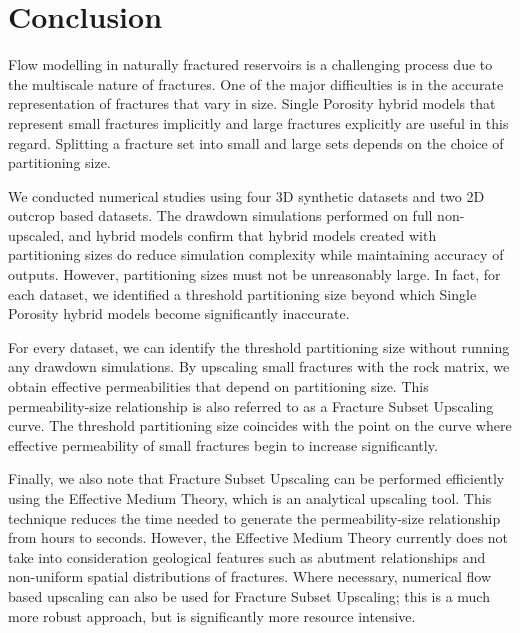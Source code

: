 \documentclass[draft]{agujournal2018}
\begin{document}
\section{Conclusion}
Flow modelling in naturally fractured reservoirs is a challenging process due to the multiscale nature of fractures. One of the major difficulties is in the accurate representation of fractures that vary in size. Single Porosity hybrid models that represent small fractures implicitly and large fractures explicitly are useful in this regard. Splitting a fracture set into small and large sets depends on the choice of partitioning size.

We conducted numerical studies using four 3D synthetic datasets and two 2D outcrop based datasets. The drawdown simulations performed on full non-upscaled, and hybrid models confirm that hybrid models created with partitioning sizes do reduce simulation complexity while maintaining accuracy of outputs. However, partitioning sizes must not be unreasonably large. In fact, for each dataset, we identified a threshold partitioning size beyond which Single Porosity hybrid models become significantly inaccurate.

For every dataset, we can identify the threshold partitioning size without running any drawdown simulations. By upscaling small fractures with the rock matrix, we obtain effective permeabilities that depend on partitioning size. This permeability-size relationship is also referred to as a Fracture Subset Upscaling curve. The threshold partitioning size coincides with the point on the curve where effective permeability of small fractures begin to increase significantly. 

Finally, we also note that Fracture Subset Upscaling can be performed efficiently using the Effective Medium Theory, which is an analytical upscaling tool. This technique reduces the time needed to generate the permeability-size relationship from hours to seconds. However, the Effective Medium Theory currently does not take into consideration geological features such as abutment relationships and non-uniform spatial distributions of fractures. Where necessary, numerical flow based upscaling can also be used for Fracture Subset Upscaling; this is a much more robust approach, but is significantly more resource intensive.


\end{document}
